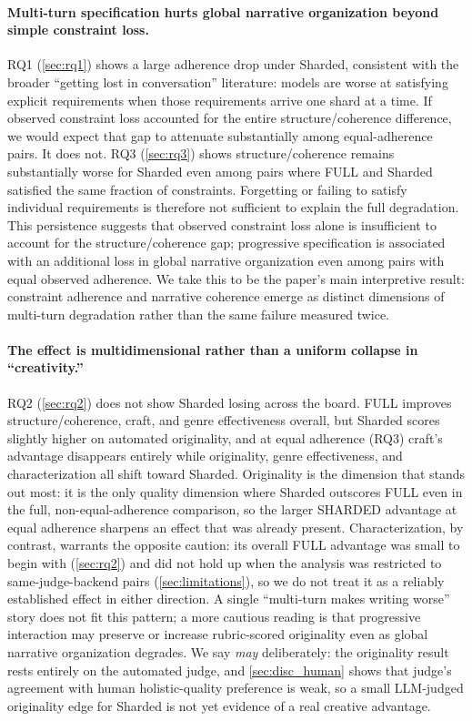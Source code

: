 \paragraph{Multi-turn specification hurts global narrative organization beyond simple constraint loss.} RQ1 (\cref{sec:rq1}) shows a large adherence drop under Sharded, consistent with the broader ``getting lost in conversation'' literature: models are worse at satisfying explicit requirements when those requirements arrive one shard at a time. If observed constraint loss accounted for the entire structure/coherence difference, we would expect that gap to attenuate substantially among equal-adherence pairs. It does not. RQ3 (\cref{sec:rq3}) shows structure/coherence remains substantially worse for Sharded even among pairs where FULL and Sharded satisfied the same fraction of constraints. Forgetting or failing to satisfy individual requirements is therefore not sufficient to explain the full degradation. This persistence suggests that observed constraint loss alone is insufficient to account for the structure/coherence gap; progressive specification is associated with an additional loss in global narrative organization even among pairs with equal observed adherence. We take this to be the paper's main interpretive result: constraint adherence and narrative coherence emerge as distinct dimensions of multi-turn degradation rather than the same failure measured twice.

\paragraph{The effect is multidimensional rather than a uniform collapse in ``creativity.''} RQ2 (\cref{sec:rq2}) does not show Sharded losing across the board. FULL improves structure/coherence, craft, and genre effectiveness overall, but Sharded scores slightly higher on automated originality, and at equal adherence (RQ3) craft's advantage disappears entirely while originality, genre effectiveness, and characterization all shift toward Sharded. Originality is the dimension that stands out most: it is the only quality dimension where Sharded outscores FULL even in the full, non-equal-adherence comparison, so the larger SHARDED advantage at equal adherence sharpens an effect that was already present. Characterization, by contrast, warrants the opposite caution: its overall FULL advantage was small to begin with (\cref{sec:rq2}) and did not hold up when the analysis was restricted to same-judge-backend pairs (\cref{sec:limitations}), so we do not treat it as a reliably established effect in either direction. A single ``multi-turn makes writing worse'' story does not fit this pattern; a more cautious reading is that progressive interaction may preserve or increase rubric-scored originality even as global narrative organization degrades. We say \emph{may} deliberately: the originality result rests entirely on the automated judge, and \cref{sec:disc_human} shows that judge's agreement with human holistic-quality preference is weak, so a small LLM-judged originality edge for Sharded is not yet evidence of a real creative advantage.

